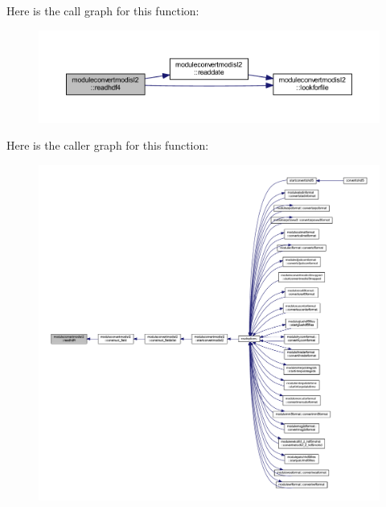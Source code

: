 Here is the call graph for this function\+:\nopagebreak
\begin{figure}[H]
\begin{center}
\leavevmode
\includegraphics[width=350pt]{namespacemoduleconvertmodisl2_a816da8e71fe8787069f3e7359fc8445f_cgraph}
\end{center}
\end{figure}
Here is the caller graph for this function\+:\nopagebreak
\begin{figure}[H]
\begin{center}
\leavevmode
\includegraphics[width=350pt]{namespacemoduleconvertmodisl2_a816da8e71fe8787069f3e7359fc8445f_icgraph}
\end{center}
\end{figure}
\mbox{\label{namespacemoduleconvertmodisl2_aa38d6c70d36fe4b61950bdeaf7f6ff18}} 

